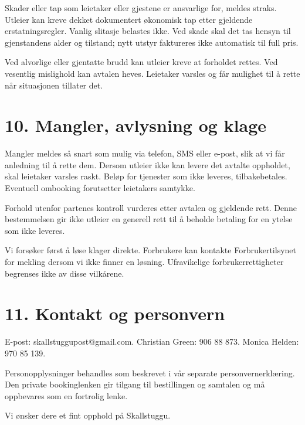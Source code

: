 \documentclass[12pt,a4paper]{article}
\begin{document}
Skader eller tap som leietaker eller gjestene er ansvarlige for, meldes straks. Utleier kan kreve dekket dokumentert økonomisk tap etter gjeldende erstatningsregler. Vanlig slitasje belastes ikke. Ved skade skal det tas hensyn til gjenstandens alder og tilstand; nytt utstyr faktureres ikke automatisk til full pris.

Ved alvorlige eller gjentatte brudd kan utleier kreve at forholdet rettes. Ved vesentlig mislighold kan avtalen heves. Leietaker varsles og får mulighet til å rette når situasjonen tillater det.


\section{10. Mangler, avlysning og klage}
Mangler meldes så snart som mulig via telefon, SMS eller e-post, slik at vi får anledning til å rette dem. Dersom utleier ikke kan levere det avtalte oppholdet, skal leietaker varsles raskt. Beløp for tjenester som ikke leveres, tilbakebetales. Eventuell ombooking forutsetter leietakers samtykke.

Forhold utenfor partenes kontroll vurderes etter avtalen og gjeldende rett. Denne bestemmelsen gir ikke utleier en generell rett til å beholde betaling for en ytelse som ikke leveres.

Vi forsøker først å løse klager direkte. Forbrukere kan kontakte Forbrukertilsynet for mekling dersom vi ikke finner en løsning. Ufravikelige forbrukerrettigheter begrenses ikke av disse vilkårene.


\section{11. Kontakt og personvern}
E-post: skallstuggupost@gmail.com. Christian Green: 906 88 873. Monica Helden: 970 85 139.

Personopplysninger behandles som beskrevet i vår separate personvernerklæring. Den private bookinglenken gir tilgang til bestillingen og samtalen og må oppbevares som en fortrolig lenke.

Vi ønsker dere et fint opphold på Skallstuggu.
\end{document}
